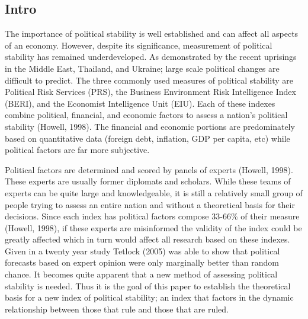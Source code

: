 \documentclass[12pt]{article}
\begin{document}
\begin{spacing}{1.5}




\section{Intro}
The importance of political stability is well established and can affect all aspects of an economy. However, despite its significance, measurement of political stability has remained underdeveloped. As demonstrated by the recent uprisings in the Middle East, Thailand, and Ukraine; large scale political changes are difficult to predict. The three commonly used measures of political stability are Political Risk Services (PRS), the Business Environment Risk Intelligence Index (BERI), and the Economist Intelligence Unit (EIU). Each of these indexes combine political, financial, and economic factors to assess a nation's political stability (Howell, 1998). The financial and economic portions are predominately based on quantitative data (foreign debt, inflation, GDP per capita, etc) while political factors are far more subjective. 

Political factors are determined and scored by panels of experts (Howell, 1998). These experts are usually former diplomats and scholars. While these teams of experts can be quite large and knowledgeable, it is still a relatively small group of people trying to assess an entire nation and without a theoretical basis for their decisions. Since each index has political factors compose 33-66\% of their measure (Howell, 1998), if these experts are misinformed the validity of the index could be greatly affected which in turn would affect all research based on these indexes. Given in a twenty year study Tetlock (2005) was able to show that political forecasts based on expert opinion were only marginally better than random chance. It becomes quite apparent that a new method of assessing political stability is needed. Thus it is the goal of this paper to establish the theoretical basis for a new index of political stability; an index that factors in the dynamic relationship between those that rule and those that are ruled.  


\end{spacing}
\end{document}

